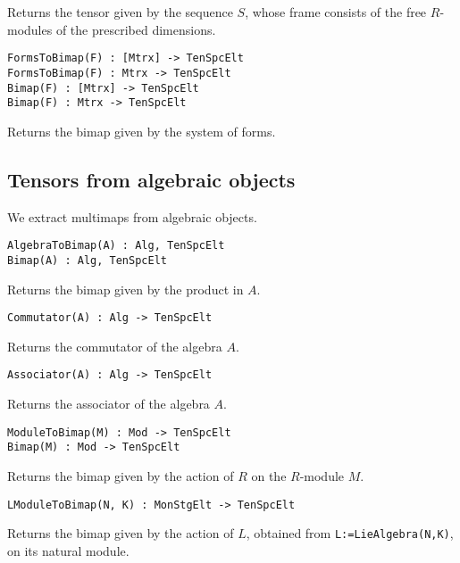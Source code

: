 \documentclass{amsart}
\begin{document}
Returns the tensor given by the sequence $S$, whose frame consists of the free 
$R$-modules of the prescribed dimensions.

\color{blue}
{\small \begin{verbatim}
FormsToBimap(F) : [Mtrx] -> TenSpcElt
FormsToBimap(F) : Mtrx -> TenSpcElt
Bimap(F) : [Mtrx] -> TenSpcElt
Bimap(F) : Mtrx -> TenSpcElt
\end{verbatim} }
\color{black}

Returns the bimap given by the system of forms.

\subsection{Tensors from algebraic objects}
We extract multimaps from algebraic objects.

\color{blue}
{\small \begin{verbatim}
AlgebraToBimap(A) : Alg, TenSpcElt
Bimap(A) : Alg, TenSpcElt
\end{verbatim} }
\color{black}

Returns the bimap given by the product in $A$.

\color{blue}
{\small \begin{verbatim}
Commutator(A) : Alg -> TenSpcElt
\end{verbatim} }
\color{black}

Returns the commutator of the algebra $A$.

\color{blue}
{\small \begin{verbatim}
Associator(A) : Alg -> TenSpcElt
\end{verbatim} }
\color{black}

Returns the associator of the algebra $A$.

\color{blue}
{\small \begin{verbatim}
ModuleToBimap(M) : Mod -> TenSpcElt
Bimap(M) : Mod -> TenSpcElt
\end{verbatim} }
\color{black}

Returns the bimap given by the action of $R$ on the $R$-module $M$.

\color{blue}
{\small \begin{verbatim}
LModuleToBimap(N, K) : MonStgElt -> TenSpcElt
\end{verbatim} }
\color{black}

Returns the bimap given by the action of $L$, obtained from 
{\tt L:=LieAlgebra(N,K)}, on its natural module.
\end{document}
